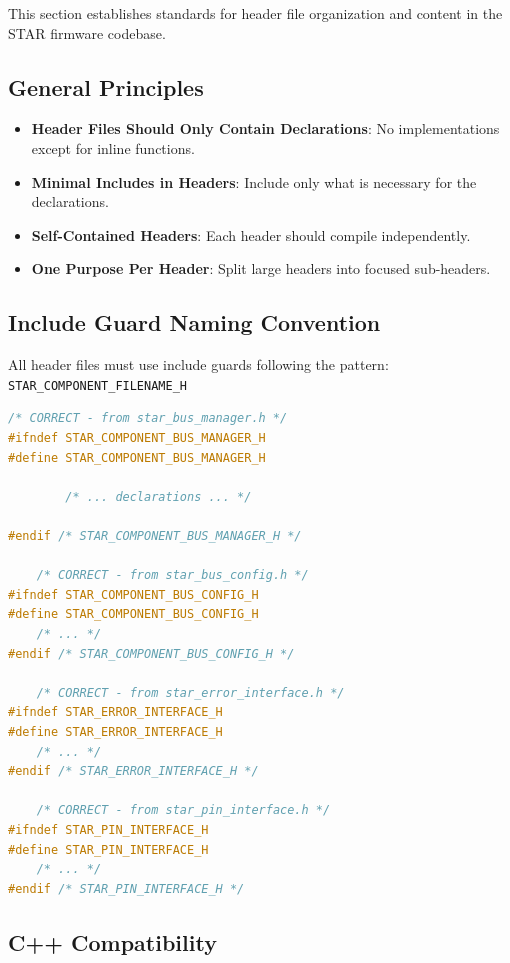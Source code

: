 This section establishes standards for header file organization and content in the STAR firmware codebase.

\subsection{General Principles}

\begin{itemize}
    \item \textbf{Header Files Should Only Contain Declarations}: No implementations except for inline functions.
    \item \textbf{Minimal Includes in Headers}: Include only what is necessary for the declarations.
    \item \textbf{Self-Contained Headers}: Each header should compile independently.
    \item \textbf{One Purpose Per Header}: Split large headers into focused sub-headers.
\end{itemize}

\subsection{Include Guard Naming Convention}

All header files must use include guards following the pattern: \texttt{
      STAR\_COMPONENT\_FILENAME\_H}

\begin{lstlisting}[language=C]
    /* CORRECT - from star_bus_manager.h */
#ifndef STAR_COMPONENT_BUS_MANAGER_H
#define STAR_COMPONENT_BUS_MANAGER_H

        /* ... declarations ... */

#endif /* STAR_COMPONENT_BUS_MANAGER_H */

    /* CORRECT - from star_bus_config.h */
#ifndef STAR_COMPONENT_BUS_CONFIG_H
#define STAR_COMPONENT_BUS_CONFIG_H
    /* ... */
#endif /* STAR_COMPONENT_BUS_CONFIG_H */

    /* CORRECT - from star_error_interface.h */
#ifndef STAR_ERROR_INTERFACE_H
#define STAR_ERROR_INTERFACE_H
    /* ... */
#endif /* STAR_ERROR_INTERFACE_H */

    /* CORRECT - from star_pin_interface.h */
#ifndef STAR_PIN_INTERFACE_H
#define STAR_PIN_INTERFACE_H
    /* ... */
#endif /* STAR_PIN_INTERFACE_H */
\end{lstlisting}

\subsection{C++ Compatibility}


